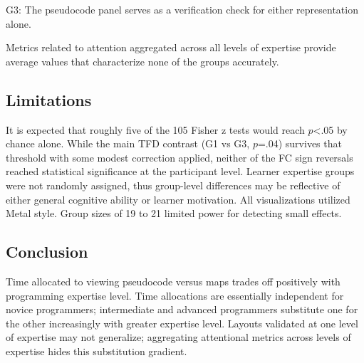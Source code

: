 \documentclass[journal]{vgtc}
\begin{document}
G3: The pseudocode panel serves as a verification check for either
representation alone.

Metrics related to attention aggregated across all levels of
expertise provide average values that characterize none of the
groups accurately.

\subsection{Limitations}

It is expected that roughly five of the 105 Fisher z tests would
reach $p$<.05 by chance alone. While the main TFD contrast (G1 vs
G3, $p$=.04) survives that threshold with some modest correction
applied, neither of the FC sign reversals reached statistical
significance at the participant level. Learner expertise groups were
not randomly assigned, thus group-level differences may be reflective
of either general cognitive ability or learner motivation. All
visualizations utilized Metal style. Group sizes of 19 to 21 limited
power for detecting small effects.

\subsection{Conclusion}

Time allocated to viewing pseudocode versus maps trades off
positively with programming expertise level. Time allocations are
essentially independent for novice programmers; intermediate and
advanced programmers substitute one for the other increasingly with
greater expertise level. Layouts validated at one level of expertise
may not generalize; aggregating attentional metrics across levels of
expertise hides this substitution gradient.




\end{document}
